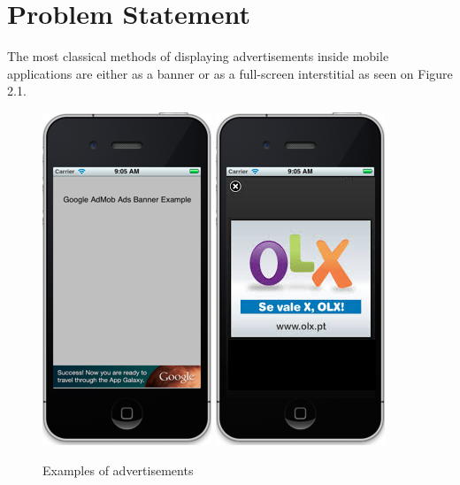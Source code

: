 
\chapter{Problem Statement} %


The most classical methods of displaying advertisements inside mobile applications are either as a banner or as a full-screen interstitial as seen on Figure 2.1.

\begin{figure}
\begin{center}
\includegraphics{Images/banner.png}
\includegraphics{Images/fullscreen.png}
\caption{Examples of advertisements \cite{image:banner_ad} \cite{image:interstitial_ad}}
\end{center}
\end{figure}

